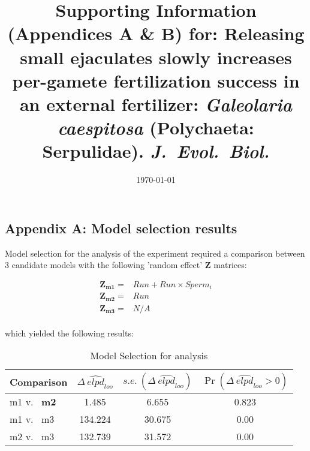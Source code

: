 \documentclass{article}
\title{Supporting Information (Appendices A \& B) for: Releasing small ejaculates slowly increases per-gamete fertilization success in an external fertilizer: \textit{Galeolaria caespitosa} (Polychaeta: Serpulidae). \textit{J.~Evol.~Biol.}}
\date{\today}
\begin{document}
\maketitle

\bigskip

\bigskip

\newpage


\subsection*{Appendix A: Model selection results}
\renewcommand{\theequation}{S\arabic{equation}}
\setcounter{equation}{0}
\renewcommand{\thefigure}{S\arabic{figure}}
\setcounter{figure}{0}
\renewcommand{\thetable}{S\arabic{table}}
\setcounter{table}{0}


Model selection for the analysis of the  experiment required a comparison between 3 candidate models with the following 'random effect' $\mathbf{Z}$ matrices:

\begin{align*}
	\mathbf{Z_{m1}} = &Run + Run \times Sperm_i \\
	\mathbf{Z_{m2}} = &Run \\
	\mathbf{Z_{m3}} = &N/A \\
\end{align*}

\noindent{} which yielded the following results: 

\begin{table}[!ht]
\caption{Model Selection for  analysis}
\label{Table:InvestModComp}
\centering
\begin{tabular}{l c c c } \hline
Comparison & $\Delta~\widehat{\textit{elpd}}_{\textit{loo}}$ & $s.e.~(\Delta~\widehat{\textit{elpd}}_{\textit{loo}})$ & $\Pr(\Delta~\widehat{\textit{elpd}}_{\textit{loo}} > 0)$ \\
\hline
m1 v.~ \textbf{m2}  & 1.485   & 6.655  & 0.823 \\
m1 v.~ m3 & 134.224 & 30.675 & 0.00  \\
m2 v.~ m3 & 132.739 & 31.572 & 0.00  \\
\hline
\end{tabular}
\bigskip{}
\end{table}
\bigskip
\end{document}
